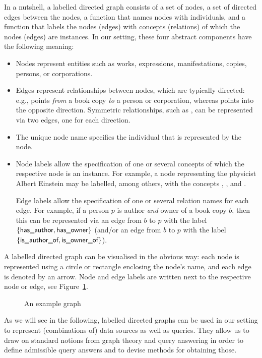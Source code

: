 In a nutshell, a labelled directed graph consists of a set of nodes, a set of directed edges between
the nodes, a function that names nodes with individuals,
and a function that labels the nodes (edges) with concepts (relations)
of which the nodes (edges) are instances.
In our setting, these four abstract components have the following meaning:
%
\begin{itemize}
  \item 
    Nodes represent entities such as works, expressions, manifestations, copies,
    persons, or corporations.
  \item 
    Edges represent relationships between nodes, which are typically directed:
    e.g.,  points \emph{from} a book copy \emph{to} a person or corporation,
    whereas  points into the opposite direction.
    Symmetric relationships, such as ,
    can be represented via two edges, one for each direction.
  \item 
    The unique node name specifies the individual that is represented by the node.
  \item 
    Node labels allow the specification of one or several concepts
    of which the respective node is an instance.
    For example, a node representing the physicist Albert Einstein
    may be labelled, among others, with the concepts , ,
    and .

    Edge labels allow the specification of one or several relation names for each edge.
    For example, if a person $p$ is author \emph{and} owner of a book copy $b$,
    then this can be represented via an edge from $b$ to $p$ with the label
    $\{\textsf{has\_author},\textsf{has\_owner}\}$
    (and/or an edge from $b$ to $p$ with the label $\{\textsf{is\_author\_of},\textsf{is\_owner\_of}\}$).
\end{itemize}
%
A labelled directed graph can be visualised in the obvious way:
each node is represented using a circle or rectangle
enclosing the node's name,
and each edge is denoted by an arrow.
Node and edge labels are written next to the respective node or edge,
see Figure~\ref{fig:example_graph}.

\begin{figure}
  \caption{An example graph}
  \label{fig:example_graph}
\end{figure}

As we will see in the following, labelled directed graphs can be used in our setting
to represent (combinations of) data sources as well as queries.
They allow us to draw on standard notions from graph theory and query answering
in order to define admissible query answers and to devise methods for obtaining those.

